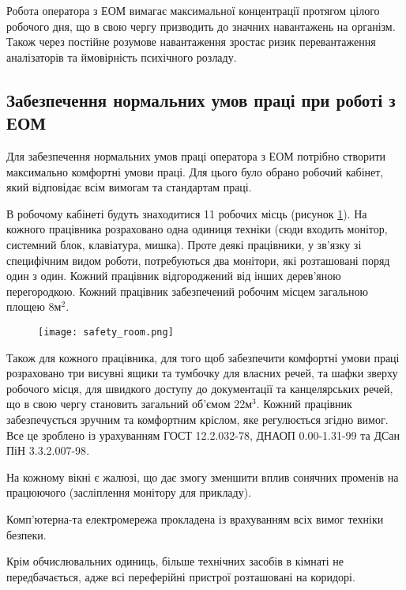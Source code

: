 \par Робота оператора з ЕОМ вимагає максимальної концентрації протягом цілого робочого дня, що в свою чергу призводить до значних навантажень на організм. Також через постійне розумове навантаження зростає ризик перевантаження аналізаторів та ймовірність психічного розладу.



\subsection{Забезпечення нормальних умов праці при роботі з ЕОМ}
\par Для забезпечення нормальних умов праці оператора з ЕОМ потрібно створити максимально комфортні умови праці. Для цього було обрано робочий кабінет, який відповідає всім вимогам та стандартам праці.
\par В робочому кабінеті будуть знаходитися 11 робочих місць (рисунок \ref{pic:safety_room}). На кожного працівника розраховано одна одиниця техніки (сюди входить монітор, системний блок, клавіатура, мишка). Проте деякі працівники, у зв'язку зі специфічним видом роботи, потребуються два монітори, які розташовані поряд один з один. Кожний працівник відгороджений від інших дерев'яною перегородкою. Кожний працівник забезпечений робочим місцем загальною площею 8м$^2$. 

\begin{figure}[!ht]
\centering
		\texttt{[image: safety\_room.png]}
		\vspace{18pt}
		\label{pic:safety_room}
\end{figure}

\par Також для кожного працівника, для того щоб забезпечити комфортні умови праці розраховано три висувні ящики та тумбочку для власних речей, та шафки зверху робочого місця, для швидкого доступу до документації та канцелярських речей, що в свою чергу становить загальний об'ємом 22м$^3$. Кожний працівник забезпечується зручним та комфортним кріслом, яке регулюється згідно вимог. Все це зроблено із урахуванням ГОСТ 12.2.032-78\cite{safety_g_1}, ДНАОП 0.00-1.31-99\cite{safety_g_2} та ДСан ПіН 3.3.2.007-98\cite{safety_g_3}.

\par На кожному вікні є жалюзі, що дає змогу зменшити вплив сонячних променів на працюючого (засліплення монітору для прикладу).
\par Комп'ютерна-та електромережа прокладена із врахуванням всіх вимог техніки безпеки.
\par Крім обчислювальних одиниць, більше технічних засобів в кімнаті не передбачається, адже всі переферійні пристрої розташовані на коридорі.


